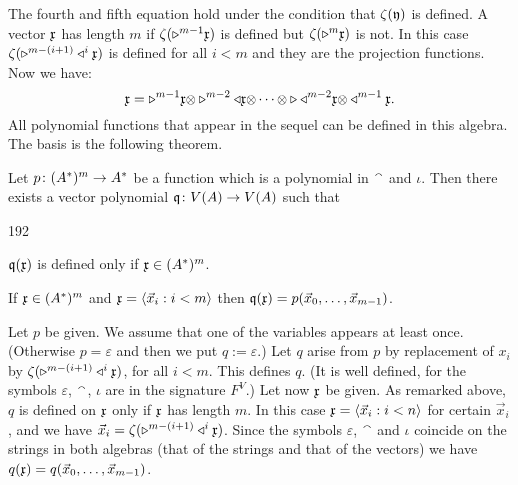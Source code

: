 The fourth and fifth equation hold under the condition
that $\zeta (\mathfrak{y})$ is defined. A vector $\mathfrak{x}$ has length
$m$ if $\zeta (\triangleright^{m-1}\mathfrak{x})$ is defined but 
$\zeta(\triangleright^m\mathfrak{x})$ is not. In this case
$\zeta (\triangleright^{m-(i+1)}\triangleleft^i \mathfrak{x})$
is defined for all $i < m$ and they are the
projection functions. Now we have:
\begin{equation}
\mathfrak{x} = \triangleright^{m-1}\mathfrak{x} \mbox{\small$\otimes$} \triangleright^{m-2}
\triangleleft \mathfrak{x} \mbox{\small$\otimes$} \dotsb \mbox{\small$\otimes$}
\triangleright \triangleleft^{m-2}\mathfrak{x} \mbox{\small$\otimes$}
\triangleleft^{m-1}\mathfrak{x}.
\end{equation}
All polynomial functions that appear in the sequel can be
defined in this algebra. The basis is the following theorem.
\begin{thm}
Let $p \colon (A^{\ast})^m \rightarrow A^{\ast}$ be a function which is
a polynomial in ${^{\smallfrown}}$ and $\iota$. Then there exists a
vector polynomial $\mathfrak{q} \colon V(A) \rightarrow V(A)$ such that
\begin{dingautolist}{192}
\item $\mathfrak{q}(\mathfrak{x})$ is defined only if $\mathfrak{x} \in (A^{\ast})^m$.
\item If $\mathfrak{x} \in (A^{\ast})^m$ and $\mathfrak{x} = \langle \vec{x}_i :
    i < m\rangle$ then
    $\mathfrak{q}(\mathfrak{x}) = p(\vec{x}_0, \dotsc, \vec{x}_{m-1})$.
\end{dingautolist}
\end{thm}
\proofbeg
Let $p$ be given. We assume that one of the variables appears
at least once. (Otherwise $p = \varepsilon$ and then we put
$q := \varepsilon$.) Let $q$ arise from $p$ by replacement
of $x_i$ by $\zeta(\triangleright^{m-(i+1)} \triangleleft^i \mathfrak{x})$,
for all $i < m$. This defines $q$. (It is well defined, for
the symbols $\varepsilon$, ${^{\smallfrown}}$, $\iota$ are in the signature
$F^V$.) Let now $\mathfrak{x}$ be given. As remarked above, $q$ is
defined on $\mathfrak{x}$ only if $\mathfrak{x}$ has length $m$. In this case
$\mathfrak{x} = \langle \vec{x}_i : i < n\rangle$ for certain $\vec{x}_i$, and
we have $\vec{x}_i = \zeta(\triangleright^{m-(i+1)} \triangleleft^i \mathfrak{x})$.
Since the symbols $\varepsilon$, ${^{\smallfrown}}$ and $\iota$ coincide on
the strings in both algebras (that of the strings and that
of the vectors) we have $q(\mathfrak{x}) = q(\vec{x}_0, \dotsc, \vec{x}_{m-1})$.
\proofend

